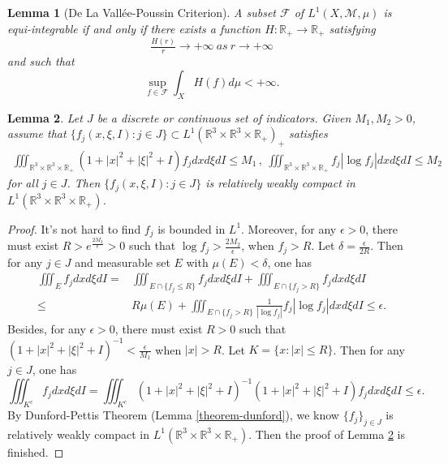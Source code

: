 \documentclass[reqno,11pt]{amsart}
\newtheorem{lemma}{Lemma}[section]
\numberwithin{equation}{section}
\def\R{\mathbb{R}}
\begin{document}
\begin{lemma}[De La Vall\'ee-Poussin Criterion]\label{theo-DE La}
	A subset $\mathscr{F}$ of $L^1(X, \mathcal{M},\mu )$ is equi-integrable if and only if there exists a function $H : \R_+ \rightarrow \R_+ $ satisfying 
	\begin{equation*}
		\tfrac{H(r)}{r} \rightarrow +\infty \ as \ r \rightarrow +\infty
	\end{equation*}
	and such that 
	\begin{equation*}
		\sup \limits_{f \in \mathscr{F}} \int_{X} H(f) d \mu  <+\infty .
	\end{equation*}
\end{lemma}

\begin{lemma}\label{rwc}
	Let $J$ be a discrete or continuous set of indicators. Given $M_1, M_2 >0$, assume that $\{ f_j (x,\xi,I):j\in J \} \subset L^1(\R^3 \times \R^3 \times \R_+)_+$ satisfies
	\begin{equation*}
    \begin{aligned}
		\iiint_{\R^3\times \R^3 \times \R_+} (1+|x|^2+|\xi|^2+I)f_j dx d\xi dI\leq M_1 \,, \ \iiint_{\R^3\times \R^3 \times \R_+} f_j |\log f_j| dxd\xi dI \leq M_2
    \end{aligned}
	\end{equation*}
	for all $j \in J$. Then $\{f_j(x,\xi,I):j\in J\}$ is relatively weakly compact in $L^1(\R^3\times \R^3 \times \R_+)$.
\end{lemma}

	\begin{proof}
	It's not hard to find $f_j$ is bounded in $L^1$. Moreover, for any $\epsilon >0$, there must exist $R > e^{ \frac{2 M_2}{\epsilon} } >0$ such that  $\log f_j >\frac{2M_2}{\epsilon }$, when $ f_j>R$. Let $\delta=\frac{\epsilon }{2R}$. Then for any $j\in J$ and measurable set $E$ with $\mu (E)<\delta$, one has
	\begin{equation*}
		\begin{aligned}
			\iiint_{E} f_j dxd\xi dI =& \iiint_{E\cap \{f_j\leq R\}} f_j dx d\xi dI +\iiint_{E\cap \{f_j> R\}} f_j dxd\xi dI \\
			\leq & R \mu (E) +\iiint_{E\cap \{f_j> R\}} \tfrac{1}{|\log f_j|}  f_j|\log f_j| dxd\xi dI 
			\leq \epsilon.
		\end{aligned}
	\end{equation*}
	Besides, for any $\epsilon>0$, there must exist $R>0$ such that $(1+|x|^2+|\xi|^2+I)^{-1} <\frac{\epsilon}{M_1}$ when $|x|>R$. Let $K=\{x:|x|\leq R\}$. Then for any $j\in J$, one has
	\begin{equation*}
		\iiint_{K^c} f_j dx d\xi dI 
		=\iiint_{K^c} (1+|x|^2+|\xi|^2+I)^{-1} (1+|x|^2+|\xi|^2+I) f_j  dx d\xi dI\leq \epsilon.
	\end{equation*}
	By Dunford-Pettis Theorem (Lemma \ref{theorem-dunford}), we know $\{f_j\}_{j \in J}$ is relatively weakly compact in $L^1(\R^3\times \R^3 \times \R_+)$. Then the proof of Lemma \ref{rwc} is finished.
\end{proof}
\end{document}
